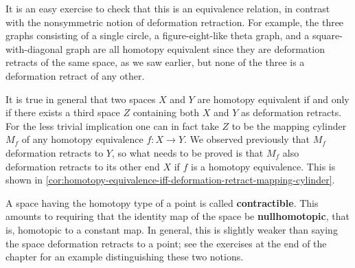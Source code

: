 It is an easy exercise to check that this is an equivalence relation, in contrast with
the nonsymmetric notion of deformation retraction. For example, the three graphs
consisting of a single circle, a figure-eight-like theta graph, and a square-with-diagonal
graph are all homotopy equivalent since they are deformation retracts of the same
space, as we saw earlier, but none of the three is a deformation retract of any other.

It is true in general that two spaces $X$ and $Y$ are homotopy equivalent if and only
if there exists a third space $Z$ containing both $X$ and $Y$ as deformation retracts.
For the less trivial implication one can in fact take $Z$ to be the mapping cylinder $M_f$
of any homotopy equivalence $f : X \to Y$. We observed previously that $M_f$ deformation
retracts to $Y$, so what needs to be proved is that $M_f$ also deformation retracts to
its other end $X$ if $f$ is a homotopy equivalence. This is shown in
\cref{cor:homotopy-equivalence-iff-deformation-retract-mapping-cylinder}.

\begin{definition}
\label{def:contractible}
\leanok
{}
A space having the homotopy type of a point is called \textbf{contractible}. This
amounts to requiring that the identity map of the space be \textbf{nullhomotopic}, that is,
homotopic to a constant map. In general, this is slightly weaker than saying the space
deformation retracts to a point; see the exercises at the end of the chapter for an
example distinguishing these two notions.
\end{definition}

